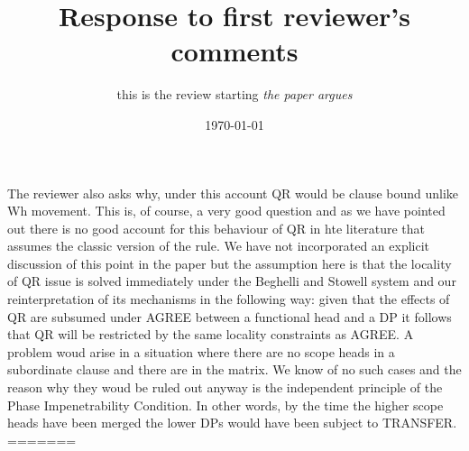 \documentclass[11pt]{article}
\begin{document}
The reviewer also asks why, under this account QR would be clause bound unlike Wh movement. This is, of course, a very good question and as we have pointed out there is no good account for this behaviour of QR in hte literature that assumes the classic version of the rule.   We have not incorporated an explicit discussion of this point in the paper but the assumption here is that the locality of QR issue is solved immediately under the Beghelli and Stowell system and our reinterpretation of its mechanisms in the following way: given that the effects of QR are subsumed under AGREE between a functional head and a DP it follows that QR will be restricted by the same locality constraints as AGREE.  A problem woud arise in a situation where there are no scope heads in a subordinate clause and there are in the matrix.  We know of no such cases and the reason why they woud be ruled out anyway is the independent principle of the Phase Impenetrability Condition.  In other words, by the time the higher scope heads have been merged the lower DPs would have been subject to TRANSFER.  
=======
\title{Response to first reviewer's comments}
\author{this is the review starting \textit{the paper argues}}
\date{\today}
\end{document}
